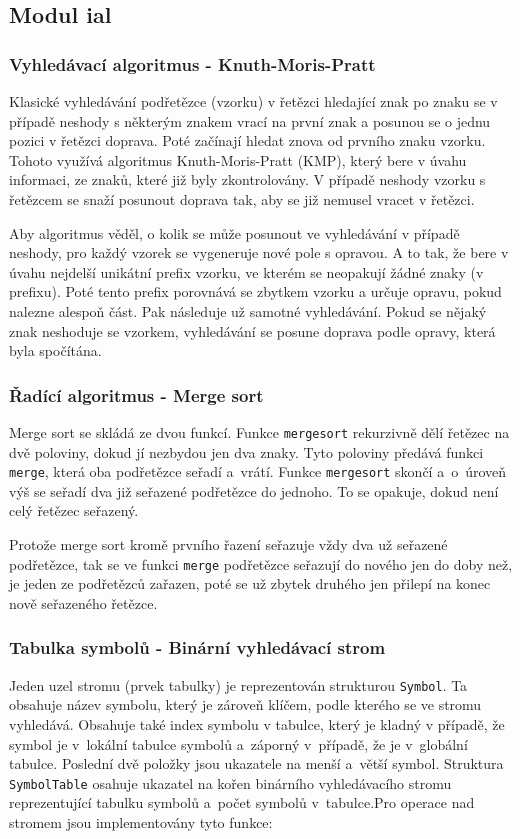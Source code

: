 \documentclass[12pt,a4paper,titlepage,final]{article}
\begin{document}
\subsection{Modul ial}
\subsubsection{Vyhledávací algoritmus - Knuth-Moris-Pratt}
Klasické vyhledávání podřetězce (vzorku) v řetězci hledající znak po znaku se 
v případě neshody s některým znakem vrací na první znak a posunou se o jednu 
pozici v řetězci doprava. Poté začínají hledat znova od prvního znaku vzorku. 
Tohoto využívá algoritmus Knuth-Moris-Pratt (KMP), který bere v úvahu informaci, 
ze znaků, které již byly zkontrolovány. V případě neshody vzorku s řetězcem se 
snaží posunout doprava tak, aby se již nemusel vracet v řetězci. 

Aby algoritmus věděl, o kolik se může posunout ve vyhledávání v případě neshody, 
pro každý vzorek se vygeneruje nové pole s opravou. A to tak, že bere v úvahu 
nejdelší unikátní prefix vzorku, ve kterém se neopakují žádné znaky (v prefixu). 
Poté tento prefix porovnává se zbytkem vzorku a určuje opravu, pokud nalezne alespoň část. 
Pak následuje už samotné vyhledávání. Pokud se nějaký znak neshoduje se vzorkem, 
vyhledávání se posune doprava podle opravy, která byla spočítána. 

\subsubsection{Řadící algoritmus - Merge sort}
Merge sort se skládá ze dvou funkcí. Funkce \texttt{mergesort} rekurzivně dělí 
řetězec na dvě poloviny, dokud jí nezbydou jen dva znaky. Tyto poloviny předává funkci
\texttt{merge}, která oba podřetězce seřadí a~vrátí. Funkce \texttt{mergesort} skončí 
a~o~úroveň výš se seřadí dva již seřazené podřetězce do jednoho. To se opakuje, dokud 
není celý řetězec seřazený.

Protože merge sort kromě prvního řazení seřazuje vždy dva už seřazené podřetězce, 
tak se ve funkci \texttt{merge} podřetězce seřazují do nového jen do doby než, 
je jeden ze podřetězců zařazen, poté se už zbytek druhého jen přilepí na konec nově 
seřazeného řetězce.  

\subsubsection{Tabulka symbolů - Binární vyhledávací strom}
Jeden uzel stromu (prvek tabulky) je reprezentován strukturou \texttt{Symbol}.
Ta obsahuje název symbolu, který je zároveň klíčem, podle kterého se ve stromu vyhledává. 
Obsahuje také index symbolu v tabulce, který je kladný v případě, že symbol je 
v~lokální tabulce symbolů a~záporný v~případě, že je v~globální tabulce. Poslední dvě 
položky jsou ukazatele na menší a~větší symbol. Struktura \texttt{SymbolTable} osahuje 
ukazatel na kořen binárního vyhledávacího stromu reprezentující tabulku symbolů a~počet 
symbolů v~tabulce.\newline\newline Pro operace nad stromem jsou implementovány tyto funkce:
\medskip
\end{document}

